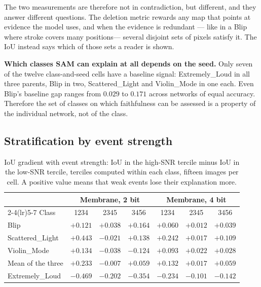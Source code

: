 The two measurements are therefore not in contradiction, but different, 
and they answer different questions. 
The deletion metric rewards any map that points at evidence the model
uses, and when the evidence is redundant --- like in a Blip where stroke covers many
positions--- several disjoint sets of pixels
satisfy it. The IoU instead says which of those sets a reader is shown.

\textbf{Which classes SAM can explain at all depends on the seed.} Only seven of
the twelve class-and-seed cells have a baseline signal: Extremely\_Loud in all
three parents, Blip in two, Scattered\_Light and Violin\_Mode in one each. Even
Blip's baseline gap ranges from $0.029$ to $0.171$ across networks of equal
accuracy. Therefore the set of classes on which faithfulness can be assessed is a property
of the individual network, not of the class.

\subsection{Stratification by event strength}

\begin{table}[htbp]
\centering
\begin{tabular}{lcccccc}
\toprule
 & \multicolumn{3}{c}{Membrane, 2 bit} & \multicolumn{3}{c}{Membrane, 4 bit} \\
\cmidrule(lr){2-4}\cmidrule(lr){5-7}
Class & 1234 & 2345 & 3456 & 1234 & 2345 & 3456 \\
\midrule
Blip            & $+0.121$ & $+0.038$ & $+0.164$ & $+0.060$ & $+0.012$ & $+0.039$ \\
Scattered\_Light & $+0.443$ & $-0.021$ & $+0.138$ & $+0.242$ & $+0.017$ & $+0.109$ \\
Violin\_Mode    & $+0.134$ & $-0.038$ & $-0.124$ & $+0.093$ & $+0.022$ & $+0.028$ \\
\midrule
Mean of the three & $+0.233$ & $-0.007$ & $+0.059$ & $+0.132$ & $+0.017$ & $+0.059$ \\
\midrule
Extremely\_Loud & $-0.469$ & $-0.202$ & $-0.354$ & $-0.234$ & $-0.101$ & $-0.142$ \\
\bottomrule
\end{tabular}
\caption{IoU gradient with event strength: IoU in the high-SNR tercile minus IoU
in the low-SNR tercile, terciles computed within each class, fifteen images per
cell. A positive value means that weak events lose their explanation more.}
\label{tab:stratified}
\end{table}

